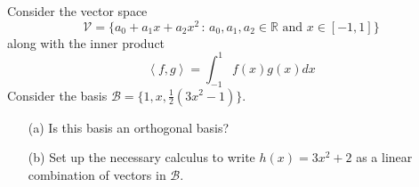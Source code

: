 \begin{problem}
   Consider the vector space  
   \[ \mathcal{V} = \{a_0 + a_1 x + a_2 x^2 \, : \, a_0, a_1, a_2 \in
       \mathbb{R} \text{ and } x \in [-1,1] \} \]
    along with the inner product 
    \[ \left< f,g\right> = \int_{-1}^1 f(x) g(x) dx \]
    Consider the basis $\mathcal{B} = \{1,x,\frac{1}{2}(3x^2-1)\}$.  
    \begin{enumerate}
        \item[(a)] Is this basis an orthogonal basis?
        \item[(b)] Set up the necessary calculus to write $h(x) = 3x^2+2$ as a linear
            combination of vectors in $\mathcal{B}$.
    \end{enumerate}
\end{problem}


